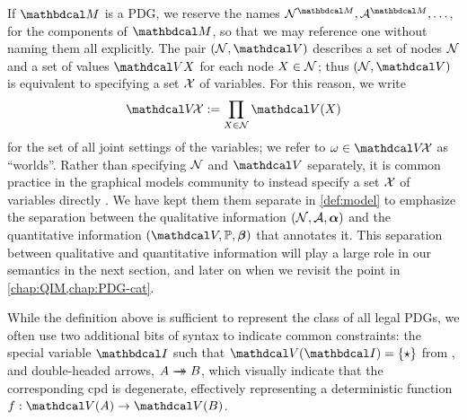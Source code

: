 If $\dg M$ is a PDG, we reserve the names 
$\N^{\dg M}, \Ar^{\dg M}, \ldots$,
for the components of $\dg M$, so that we may reference one without naming them
all explicitly.
The pair $(\N, \V)$ describes a set of nodes $\mathcal N$ and a set of values $\V X$ for each node $X \in \mathcal N$;
    thus $(\N,\V)$ is equivalent to specifying a set $\mathcal X$ of variables.
For this reason, we write 
\[
    \V\!\X := \prod_{X \in \N} \V(X)
\]
for the set of all joint settings of the variables; we refer to $\omega \in \V\!\X$ as ``worlds''.
Rather than specifying $\mathcal N$ and $\V$ separately, it is common practice in the graphical models community to instead specify a set $\mathcal X$ of variables directly \cite{koller2009probabilistic}.
We have kept them them separate in \cref{def:model} to emphasize the separation between the qualitative information $(\mathcal N, \mathcal A, \boldsymbol\alpha)$ and the quantitative information $(\V, \mathbb P, \bbeta)$ that annotates it. 
This separation between qualitative and quantitative information will
    play a large role in our semantics in the next section, 
    and later on when we revisit the point in \cref{chap:QIM,chap:PDG-cat}.

While the definition above is sufficient to represent the class of all legal
PDGs, we often use two additional bits of syntax
to indicate common constraints:  
the special variable $\pdgunit$ such that $\V(\pdgunit)=\{\star\}$
from , and
double-headed arrows, $A \rightarrow\mathrel{\mspace{-15mu}}\rightarrow B$, which visually indicate 
that the corresponding cpd is degenerate, effectively representing a deterministic
function $f : \V(A) \to \V(B)$. 

